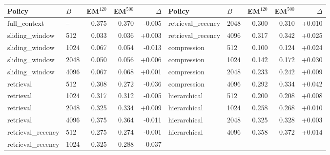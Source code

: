 \begin{tabular}{@{}llrrr@{\hspace{9pt}}llrrr@{}}
\toprule
Policy & $B$ & EM$^{120}$ & EM$^{500}$ & $\Delta$ & Policy & $B$ & EM$^{120}$ & EM$^{500}$ & $\Delta$ \\
\midrule
full\_context & -- & 0.375 & 0.370 & -0.005 & retrieval\_recency & 2048 & 0.300 & 0.310 & +0.010 \\
sliding\_window & 512 & 0.033 & 0.036 & +0.003 & retrieval\_recency & 4096 & 0.317 & 0.342 & +0.025 \\
sliding\_window & 1024 & 0.067 & 0.054 & -0.013 & compression & 512 & 0.100 & 0.124 & +0.024 \\
sliding\_window & 2048 & 0.050 & 0.056 & +0.006 & compression & 1024 & 0.142 & 0.172 & +0.030 \\
sliding\_window & 4096 & 0.067 & 0.068 & +0.001 & compression & 2048 & 0.233 & 0.242 & +0.009 \\
retrieval & 512 & 0.308 & 0.272 & -0.036 & compression & 4096 & 0.292 & 0.334 & +0.042 \\
retrieval & 1024 & 0.317 & 0.312 & -0.005 & hierarchical & 512 & 0.200 & 0.208 & +0.008 \\
retrieval & 2048 & 0.325 & 0.334 & +0.009 & hierarchical & 1024 & 0.258 & 0.268 & +0.010 \\
retrieval & 4096 & 0.375 & 0.364 & -0.011 & hierarchical & 2048 & 0.325 & 0.328 & +0.003 \\
retrieval\_recency & 512 & 0.275 & 0.274 & -0.001 & hierarchical & 4096 & 0.358 & 0.372 & +0.014 \\
retrieval\_recency & 1024 & 0.325 & 0.288 & -0.037 & & & & \\
\bottomrule
\end{tabular}
